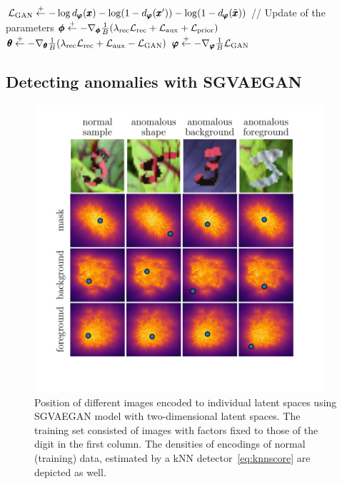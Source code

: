 \begin{algorithm}
\begin{algorithmic}[1]
        \State $\mathcal{L}_{\text{GAN}} \stackrel{+}\leftarrow - \log d_{\pmb{{\varphi}}}(\pmb{{x}}) - \log (1 - d_{\pmb{{\varphi}}}(\pmb{{x}}')) - \log (1-d_{\pmb{{\varphi}}}(\tilde{\pmb{{x}}}))$
    \EndFor
    \State // Update of the parameters
    \State $\pmb{{\phi}} \stackrel{+}\leftarrow -\nabla_{\pmb{{\phi}}} \frac{1}{B} (\lambda_{\text{rec}} \mathcal{L}_{\text{rec}} + \mathcal{L}_{\text{aux}} + \mathcal{L}_{\text{prior}})$
    \State $\pmb{{\theta}} \stackrel{+}\leftarrow -\nabla_{\pmb{{\theta}}} \frac{1}{B} (\lambda_{\text{rec}} \mathcal{L}_{\text{rec}} + \mathcal{L}_{\text{aux}} - \mathcal{L}_{\text{GAN}})$
    \State $\pmb{{\varphi}} \stackrel{+}\leftarrow -\nabla_{\pmb{{\varphi}}} \frac{1}{B} \mathcal{L}_{\text{GAN}}$
\EndWhile
{}
\end{algorithmic}
\end{algorithm}

\subsection{Detecting anomalies with SGVAEGAN} \label{sec:anomaly_detection}

\begin{figure}[ht!]
    \centering
        \includegraphics[width=0.95\textwidth]{data/chapter_sgvaegan/fig3_latent_decomposition_example.pdf}
    \caption{Position of different images encoded to individual latent spaces using SGVAEGAN model with two-dimensional latent spaces. The training set consisted of images with factors fixed to those of the digit in the first column. The densities of encodings of normal (training) data, estimated by a kNN detector~\eqref{eq:knnscore} are depicted as well.}
    \label{fig:latent_decomposition_example}
\end{figure}

